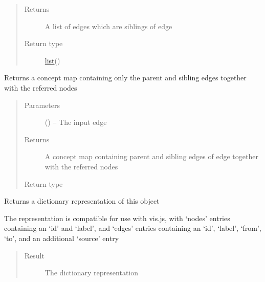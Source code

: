 \documentclass[letterpaper,10pt,english]{sphinxmanual}
\begin{document}
\begin{fulllineitems}
\begin{fulllineitems}
\begin{quote}
\begin{description}
\begin{itemize}
\end{itemize}

\item[{Returns}] \leavevmode
A list of edges which are siblings of edge

\item[{Return type}] \leavevmode
\href{https://docs.python.org/2/library/functions.html\#list}{list}({\hyperref[\detokenize{edge:module-edge}]{}})

\end{description}\end{quote}

\end{fulllineitems}


\begin{fulllineitems}
\label{\detokenize{concept_map:concept_map.ConceptMap.get_partial_map}}
Returns a concept map containing only the parent and sibling edges together with the referred nodes
\begin{quote}\begin{description}
\item[{Parameters}] \leavevmode
{} ({\hyperref[\detokenize{edge:edge.Edge}]{}}) -- The input edge

\item[{Returns}] \leavevmode
A concept map containing parent and sibling edges of edge together with the referred nodes

\item[{Return type}] \leavevmode
{\hyperref[\detokenize{concept_map:concept_map.ConceptMap}]{}}

\end{description}\end{quote}

\end{fulllineitems}


\begin{fulllineitems}
\label{\detokenize{concept_map:concept_map.ConceptMap.to_dict}}
Returns a dictionary representation of this object

The representation is compatible for use with vis.js, with `nodes' entries containing an `id' and `label', and `edges' entries containing an `id', `label', `from', `to', and an additional `source' entry
\begin{quote}\begin{description}
\item[{Result}] \leavevmode
The dictionary representation


\end{description}
\end{quote}
\end{fulllineitems}
\end{fulllineitems}
\end{document}
